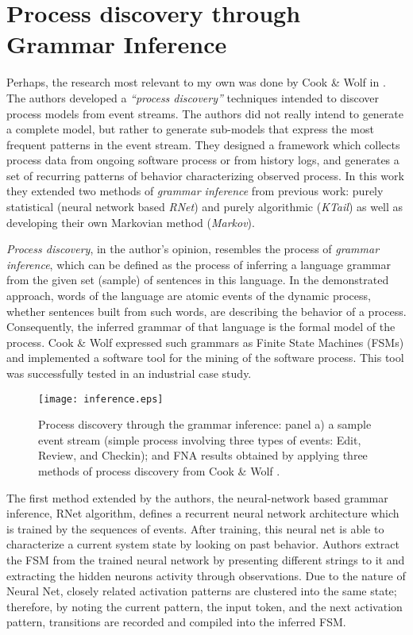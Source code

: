 \section{Process discovery through Grammar Inference} \label{grammar}
Perhaps, the research most relevant to my own was done by Cook \& Wolf in \cite{citeulike:328044}. The authors developed a \textit{``process discovery''} techniques intended to discover process models from event streams. The authors did not really intend to generate a complete model, but rather to generate sub-models that express the most frequent patterns in the event stream. They designed a framework which collects process data from ongoing software process or from history logs, and generates a set of recurring patterns of behavior characterizing observed process. In this work they extended two methods of \textit{grammar inference} from previous work: purely statistical (neural network based \textit{RNet}) and purely algorithmic (\textit{KTail}) as well as developing their own Markovian method (\textit{Markov}). 

\textit{Process discovery}, in the author's opinion, resembles the process of \textit{grammar inference}, which can be defined as the process of inferring a language grammar from the given set (sample) of sentences in this language. In the demonstrated approach, words of the language are atomic events of the dynamic process, whether sentences built from such words, are describing the behavior of a process. Consequently, the inferred grammar of that language is the formal model of the process. Cook \& Wolf expressed such grammars as Finite State Machines (FSMs) and implemented a software tool for the mining of the software process. This tool was successfully tested in an industrial case study.

\begin{figure}[tbp]
   \centering
   \texttt{[image: inference.eps]}
   \caption{Process discovery through the grammar inference: panel a) a sample event stream (simple process involving three types of events: Edit, Review, and Checkin); and FNA results obtained by applying three methods of process discovery from Cook \& Wolf \cite{citeulike:328044}.}
   \label{fig:inference}
\end{figure}

The first method extended by the authors, the neural-network based grammar inference, RNet algorithm, defines a recurrent neural network architecture which is trained by the sequences of events. After training, this neural net is able to characterize a current system state by looking on past behavior. Authors extract the FSM from the trained neural network by presenting different strings to it and extracting the hidden neurons activity through observations. Due to the nature of Neural Net, closely related activation patterns are clustered into the same state; therefore, by noting the current pattern, the input token, and the next activation pattern, transitions are recorded and compiled into the inferred FSM.

